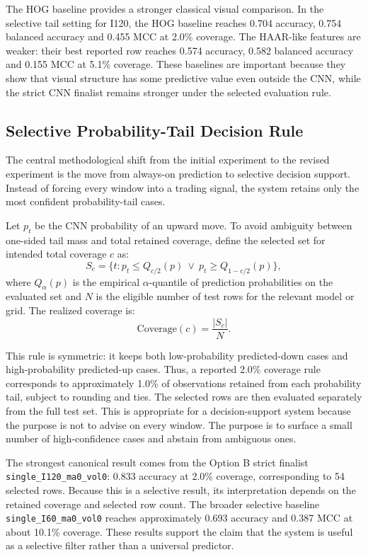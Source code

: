 The HOG baseline provides a stronger classical visual comparison. In the selective tail setting for I120, the HOG baseline reaches 0.704 accuracy, 0.754 balanced accuracy and 0.455 MCC at 2.0\% coverage. The HAAR-like features are weaker: their best reported row reaches 0.574 accuracy, 0.582 balanced accuracy and 0.155 MCC at 5.1\% coverage. These baselines are important because they show that visual structure has some predictive value even outside the CNN, while the strict CNN finalist remains stronger under the selected evaluation rule.

\subsection{Selective Probability-Tail Decision Rule}
\label{subsec:selective_rule}

The central methodological shift from the initial experiment to the revised experiment is the move from always-on prediction to selective decision support. Instead of forcing every window into a trading signal, the system retains only the most confident probability-tail cases.

Let \(p_t\) be the CNN probability of an upward move. To avoid ambiguity between one-sided tail mass and total retained coverage, define the selected set for intended total coverage \(c\) as:
\begin{equation}
S_c = \{t: p_t \leq Q_{c/2}(p) \ \lor \ p_t \geq Q_{1-c/2}(p)\},
\label{eq:selective_set}
\end{equation}
where \(Q_{\alpha}(p)\) is the empirical \(\alpha\)-quantile of prediction probabilities on the evaluated set and \(N\) is the eligible number of test rows for the relevant model or grid. The realized coverage is:
\begin{equation}
\text{Coverage}(c) = \frac{|S_c|}{N}.
\label{eq:coverage}
\end{equation}

This rule is symmetric: it keeps both low-probability predicted-down cases and high-probability predicted-up cases. Thus, a reported 2.0\% coverage rule corresponds to approximately 1.0\% of observations retained from each probability tail, subject to rounding and ties. The selected rows are then evaluated separately from the full test set. This is appropriate for a decision-support system because the purpose is not to advise on every window. The purpose is to surface a small number of high-confidence cases and abstain from ambiguous ones.

The strongest canonical result comes from the Option B strict finalist \texttt{single\_I120\_ma0\_vol0}: 0.833 accuracy at 2.0\% coverage, corresponding to 54 selected rows. Because this is a selective result, its interpretation depends on the retained coverage and selected row count. The broader selective baseline \texttt{single\_I60\_ma0\_vol0} reaches approximately 0.693 accuracy and 0.387 MCC at about 10.1\% coverage. These results support the claim that the system is useful as a selective filter rather than a universal predictor.


